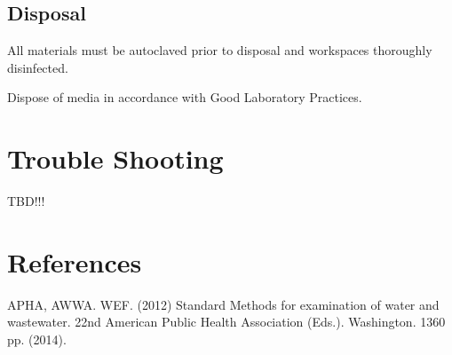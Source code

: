 \documentclass[12pt]{../SOP4_alpha}\usepackage[]{graphicx}\usepackage[]{xcolor}
\begin{document}
\subsection{Disposal}


\NP All materials must be autoclaved prior to disposal and workspaces
thoroughly disinfected.

\NP Dispose of media in accordance with Good Laboratory Practices.

\section{Trouble Shooting}

TBD!!! 


\section{References}

\NP APHA, AWWA. WEF. (2012) Standard Methods for examination of water and wastewater. 22nd American Public Health Association (Eds.). Washington. 1360 pp. (2014).

\appendix



\end{document}
